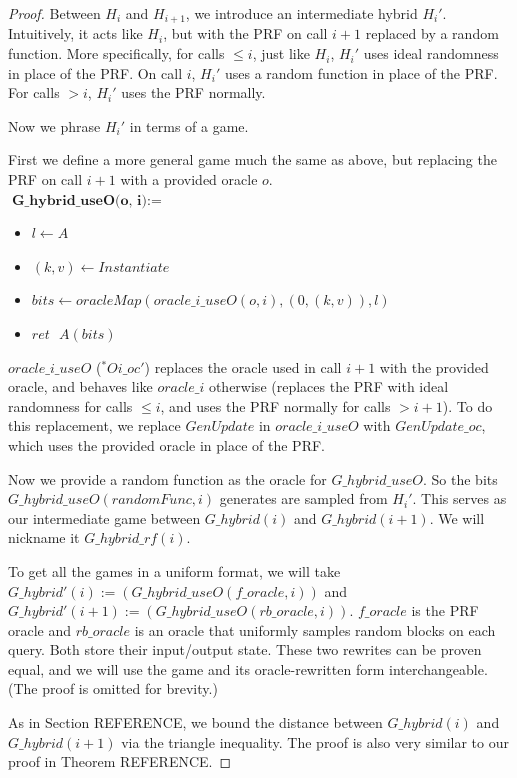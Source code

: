 \documentclass[12pt,lot, lof]{puthesis}
\newenvironment{game}
{ \begin{itemize}[noitemsep,nolistsep] 
}
{ \end{itemize}                  }
\newcommand{\s} {\textrm{ }}
\newcommand{\lar}{\leftarrow}
\begin{document}
\begin{proof}
Between $H_i$ and $H_{i+1}$, we introduce an intermediate hybrid $H_i'$. Intuitively, it acts like $H_i$, but with the PRF on call $i+1$ replaced by a random function. More specifically, for calls $\leq i$, just like $H_i$, $H_i'$ uses ideal randomness in place of the PRF. On call $i$, $H_i'$ uses a random function in place of the PRF. For calls $> i$, $H_i'$ uses the PRF normally.

Now we phrase $H_i'$ in terms of a game.

First we define a more general game much the same as above, but replacing the PRF on call $i+1$ with a provided oracle $o$. \\

$\textbf{G\_hybrid\_useO(o, i)} := $
\begin{game}
\item[] $l \leftarrow A$
\item[] $(k,v) \leftarrow Instantiate$
\item[] $bits \lar oracleMap(oracle\_i\_useO(o, i),(0, (k, v)),l)$
\item[] $ret \s A(bits)$ \\
\end{game}

$oracle\_i\_useO$ ($^*Oi\_oc'$) replaces the oracle used in call $i+1$ with the provided oracle, and behaves like $oracle\_i$ otherwise (replaces the PRF with ideal randomness for calls $\leq i$, and uses the PRF normally for calls $> i+1$). To do this replacement, we replace $GenUpdate$ in $oracle\_i\_useO$ with $GenUpdate\_oc$, which uses the provided oracle in place of the PRF.

Now we provide a random function as the oracle for $G\_hybrid\_useO$. So the bits $G\_hybrid\_useO(randomFunc, i)$ generates are sampled from $H_i'$. This serves as our intermediate game between $G\_hybrid(i)$ and $G\_hybrid(i+1)$. We will nickname it $G\_hybrid\_rf(i)$.

To get all the games in a uniform format, we will take $G\_hybrid'(i) := (G\_hybrid\_useO(f\_oracle, i))$ and $G\_hybrid'(i+1) := (G\_hybrid\_useO(rb\_oracle, i))$. $f\_oracle$ is the PRF oracle and $rb\_oracle$ is an oracle that uniformly samples random blocks on each query. Both store their input/output state. These two rewrites can be proven equal, and we will use the game and its oracle-rewritten form interchangeable. (The proof is omitted for brevity.)

As in Section REFERENCE, we bound the distance between $G\_hybrid(i)$ and $G\_hybrid(i+1)$ via the triangle inequality. The proof is also very similar to our proof in Theorem REFERENCE. 


\end{proof}
\end{document}
